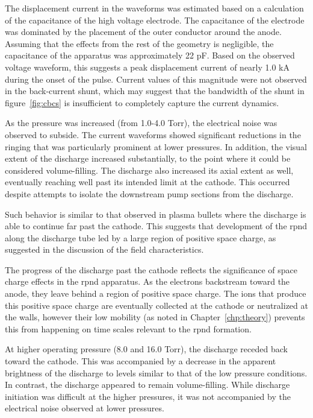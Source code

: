 The displacement current in the waveforms was estimated based on a calculation
of the capacitance of the high voltage electrode. The capacitance of the
electrode was dominated by the placement of the outer conductor around the
anode. Assuming that the effects from the rest of the geometry is negligible,
the capacitance of the apparatus was approximately 22 pF. Based on the observed
voltage waveform, this suggests a peak displacement current of nearly 1.0 kA
during the onset of the pulse. Current values of this magnitude were not
observed in the back-current shunt, which may suggest that the bandwidth of the
shunt in figure~\ref{fig:cbcs} is insufficient to completely capture the current
dynamics.

As the pressure was increased (from 1.0-4.0 Torr), the electrical noise was
observed to subside. The current waveforms showed significant reductions in the
ringing that was particularly prominent at lower pressures. In addition, the
visual extent of the discharge increased substantially, to the point where it
could be considered volume-filling. The discharge also increased its axial
extent as well, eventually reaching well past its intended limit at the cathode.
This occurred despite attempts to isolate the downstream pump sections from the
discharge. 

Such behavior is similar to that observed in plasma bullets \cite{Lu2006} where
the discharge is able to continue far past the cathode. This suggests that
development of the \acs{rpnd} along the discharge tube led by a large region of
positive space charge, as suggested in the discussion of the field
characteristics.

The progress of the discharge past the cathode reflects the significance of
space charge effects in the \acs{rpnd} apparatus. As the electrons backstream
toward the anode, they leave behind a region of positive space charge. The ions
that produce this positive space charge are eventually collected at the cathode
or neutralized at the walls, however their low mobility (as noted in
Chapter~\ref{chp:theory}) prevents this from happening on time scales relevant
to the \acs{rpnd} formation.

At higher operating pressure (8.0 and 16.0 Torr), the discharge receded back
toward the cathode. This was accompanied by a decrease in the apparent
brightness of the discharge to levels similar to that of the low pressure
conditions. In contrast, the discharge appeared to remain volume-filling. While
discharge initiation was difficult at the higher pressures, it was not
accompanied by the electrical noise observed at lower pressures.

